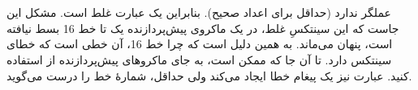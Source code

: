 \section{}
\paragraph{}\label{answer:79}
 عملگر \lr{\texttt{**}} ندارد (حداقل برای اعداد صحیح). بنابراین  یک عبارت غلط است. مشکل این جاست که این سینتکسِ غلط، در یک ماکروی پیش‌پردازنده یک تا خط 16 بسط نیافته است، پنهان می‌ماند. به همین دلیل است که چرا خط 16، آن خطی است که خطای سینتکس دارد. تا آن جا که ممکن است، به جای ماکروهای پیش‌پردازنده از  استفاده کنید. عبارت  نیز یک پیغام خطا ایجاد می‌کند ولی حداقل، شمارهٔ خط را درست می‌گوید.